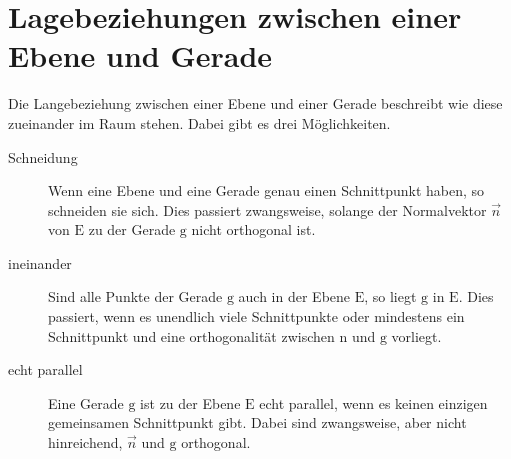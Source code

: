 \documentclass{article}
\begin{document}
 
\newcommand{\vect}[1]{\overrightarrow{#1}}
\newcommand{\drawplane}[0]{ 
 \begin{scope} 
  \clip(-0.7,0) rectangle (3.7,3);
  \fill[blue!20] (1.2-0*1.2-1.4,1-0*0.7+0.3) -- (1.2+1*1.2-1.4,1+1*0.7+0.3) -- (1.2+1*1.2+1.4,1+1*0.7-0.3) -- (1.2-0*1.2+1.4,1-0*0.7-0.3) -- cycle;
  \draw (1.5, 1.6) node[black] {$\mathrm{E}$}; 
 \end{scope}
} 
 
\newcommand{\drawuv}[0]{ 
 \draw[->,thick,blue] (0.3,1.35) -- ++(1.2*0.5,0.7*0.5) node[above left] {$\vect{u}$};
 \draw[->,thick,red] (0.3,1.35) -- ++(1.4*0.5,-0.3*0.5) node[below left] {$\vect{v}$}; 
} 
  
\section{Lagebeziehungen zwischen einer Ebene und Gerade}
Die Langebeziehung zwischen einer Ebene und einer Gerade beschreibt wie diese zueinander im Raum stehen. Dabei gibt es drei Möglichkeiten.
\begin{description}
 \item[Schneidung] Wenn eine Ebene und eine Gerade genau einen Schnittpunkt haben, so schneiden sie sich. Dies passiert zwangsweise, solange der Normalvektor $\vect{n}$ von $\mathrm{E}$ zu der Gerade $\mathrm{g}$ nicht orthogonal ist.
 \item[ineinander] Sind alle Punkte der Gerade $\mathrm{g}$ auch in der Ebene $\mathrm{E}$, so liegt $\mathrm{g}$ in $\mathrm{E}$. Dies passiert, wenn es unendlich viele Schnittpunkte oder mindestens ein Schnittpunkt und eine orthogonalität zwischen $\mathrm{n}$ und $\mathrm{g}$ vorliegt. 
 \item[echt parallel] Eine Gerade $\mathrm{g}$ ist zu der Ebene $\mathrm{E}$ echt parallel, wenn es keinen einzigen gemeinsamen Schnittpunkt gibt. Dabei sind zwangsweise, aber nicht hinreichend, $\vect{n}$ und $\mathrm{g}$ orthogonal.
\end{description}
 
\end{document}
